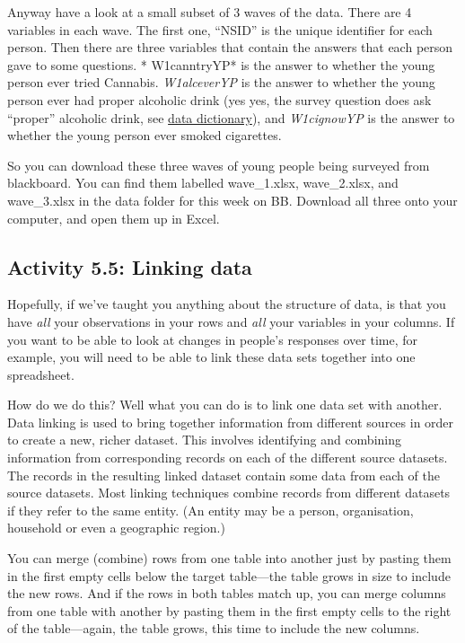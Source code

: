 \documentclass[
]{book}
\begin{document}
Anyway have a look at a small subset of 3 waves of the data. There are 4 variables in each wave. The first one, ``NSID'' is the unique identifier for each person. Then there are three variables that contain the answers that each person gave to some questions. * W1canntryYP* is the answer to whether the young person ever tried Cannabis. \emph{W1alceverYP} is the answer to whether the young person ever had proper alcoholic drink (yes yes, the survey question does ask ``proper'' alcoholic drink, see \href{http://doc.ukdataservice.ac.uk/doc/5545/mrdoc/ukda_data_dictionaries.zip}{data dictionary}), and \emph{W1cignowYP} is the answer to whether the young person ever smoked cigarettes.

So you can download these three waves of young people being surveyed from blackboard. You can find them labelled wave\_1.xlsx, wave\_2.xlsx, and wave\_3.xlsx in the data folder for this week on BB. Download all three onto your computer, and open them up in Excel.

\hypertarget{activity-5.5-linking-data}{%
\subsection{Activity 5.5: Linking data}\label{activity-5.5-linking-data}}

Hopefully, if we've taught you anything about the structure of data, is that you have \emph{all} your observations in your rows and \emph{all} your variables in your columns. If you want to be able to look at changes in people's responses over time, for example, you will need to be able to link these data sets together into one spreadsheet.

How do we do this? Well what you can do is to link one data set with another. Data linking is used to bring together information from different sources in order to create a new, richer dataset. This involves identifying and combining information from corresponding records on each of the different source datasets. The records in the resulting linked dataset contain some data from each of the source datasets. Most linking techniques combine records from different datasets if they refer to the same entity. (An entity may be a person, organisation, household or even a geographic region.)

You can merge (combine) rows from one table into another just by pasting them in the first empty cells below the target table---the table grows in size to include the new rows. And if the rows in both tables match up, you can merge columns from one table with another by pasting them in the first empty cells to the right of the table---again, the table grows, this time to include the new columns.
\end{document}
